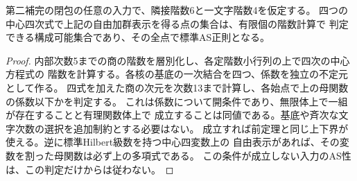 \begin{proposition}\label{prop:klein-central-strata}
第二補完の閉包の任意の入力で、隣接階数6と一文字階数4を仮定する。
四つの中心四次式で上記の自由加群表示を得る点の集合は、有限個の階数計算で
判定できる構成可能集合であり、その全点で標準AS正則となる。
\end{proposition}
\begin{proof}
内部次数5までの商の階数を層別化し、各定階数小行列の上で四次の中心方程式の
階数を計算する。各核の基底の一次結合を四つ、係数を独立の不定元として作る。
四式を加えた商の次元を次数13まで計算し、各始点で上の母関数の係数以下かを判定する。
これは係数について開条件であり、無限体上で一組が存在することと有理関数体上で
成立することは同値である。基底や斉次な文字次数の選択を追加制約とする必要はない。
成立すれば前定理と同じ上下界が使える。逆に標準Hilbert級数を持つ中心四変数上の
自由表示があれば、その変数を割った母関数は必ず上の多項式である。
この条件が成立しない入力のAS性は、この判定だけからは従わない。
\end{proof}
